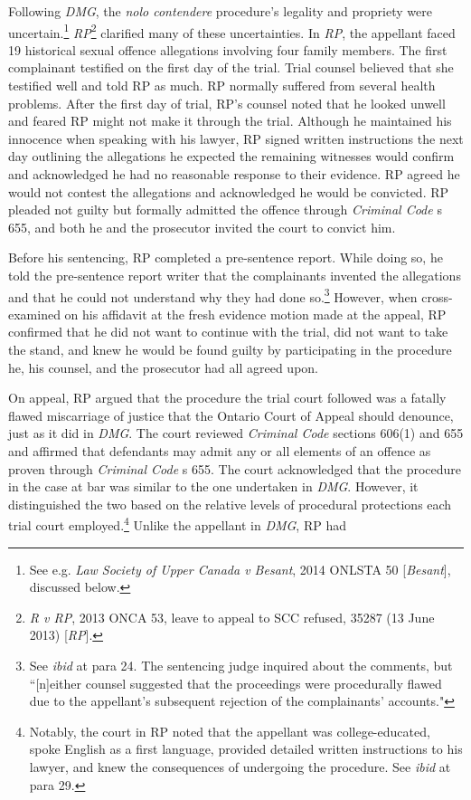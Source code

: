 Following \textit{DMG}, the \textit{nolo contendere} procedure's legality and propriety were uncertain.\footnote{See e.g. \textit{Law Society of Upper Canada v Besant}, 2014 ONLSTA 50 [\textit{Besant}], discussed below.} \textit{RP}\footnote{\textit{R v RP}, 2013 ONCA 53, leave to appeal to SCC refused, 35287 (13 June 2013) [\textit{RP}].} clarified many of these uncertainties. In \textit{RP}, the appellant faced 19 historical sexual offence allegations involving four family members. The first complainant testified on the first day of the trial. Trial counsel believed that she testified well and told RP as much. RP normally suffered from several health problems. After the first day of trial, RP's counsel noted that he looked unwell and feared RP might not make it through the trial. Although he maintained his innocence when speaking with his lawyer, RP signed written instructions the next day outlining the allegations he expected the remaining witnesses would confirm and acknowledged he had no reasonable response to their evidence. RP agreed he would not contest the allegations and acknowledged he would be convicted. RP pleaded not guilty but formally admitted the offence through \textit{Criminal Code} s 655, and both he and the prosecutor invited the court to convict him.

Before his sentencing, RP completed a pre-sentence report. While doing so, he told the pre-sentence report writer that the complainants invented the allegations and that he could not understand why they had done so.\footnote{See \textit{ibid} at para 24. The sentencing judge inquired about the comments, but ``[n]either counsel suggested that the proceedings were procedurally flawed due to the appellant's subsequent rejection of the complainants' accounts."} However, when cross-examined on his affidavit at the fresh evidence motion made at the appeal, RP confirmed that he did not want to continue with the trial, did not want to take the stand, and knew he would be found guilty by participating in the procedure he, his counsel, and the prosecutor had all agreed upon.

On appeal, RP argued that the procedure the trial court followed was a fatally flawed miscarriage of justice that the Ontario Court of Appeal should denounce, just as it did in \textit{DMG}. The court reviewed \textit{Criminal Code} sections 606(1) and 655 and affirmed that defendants may admit any or all elements of an offence as proven through \textit{Criminal Code} s 655. The court acknowledged that the procedure in the case at bar was similar to the one undertaken in \textit{DMG}. However, it distinguished the two based on the relative levels of procedural protections each trial court employed.\footnote{Notably, the court in RP noted that the appellant was college-educated, spoke English as a first language, provided detailed written instructions to his lawyer, and knew the consequences of undergoing the procedure. See \textit{ibid} at para 29.} Unlike the appellant in \textit{DMG}, RP had 

